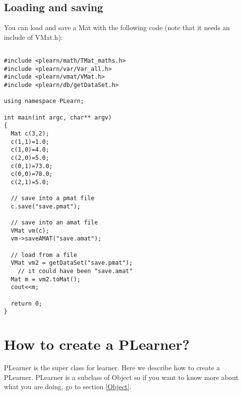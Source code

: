 \documentclass[11pt]{book}
\begin{document}
\subsection{Loading and saving}
You can load and save a Mat with the following code (note that it needs an 
include of VMat.h):
\begin{verbatim}

#include <plearn/math/TMat_maths.h>
#include <plearn/var/Var_all.h>
#include <plearn/vmat/VMat.h>
#include <plearn/db/getDataSet.h>

using namespace PLearn;

int main(int argc, char** argv)
{
  Mat c(3,2);
  c(1,1)=1.0;
  c(1,0)=4.0;
  c(2,0)=5.0;
  c(0,1)=73.0;
  c(0,0)=78.0;
  c(2,1)=5.0;

  // save into a pmat file
  c.save("save.pmat");

  // save into an amat file
  VMat vm(c);
  vm->saveAMAT("save.amat");

  // load from a file
  VMat vm2 = getDataSet("save.pmat");
    // it could have been "save.amat"
  Mat m = vm2.toMat();
  cout<<m;

  return 0;
}

\end{verbatim}



\section{How to create a PLearner?}

PLearner is the super class for learner. Here we describe how to create a PLearner. PLearner is a subclass of Object so if you want to know more about what you are doing, go to section \ref{Object}.
\end{document}
